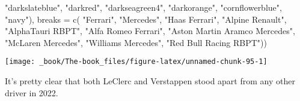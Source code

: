 \documentclass[
]{book}
\newenvironment{Shaded}{\begin{snugshade}}{\end{snugshade}}
\newcommand{\AttributeTok}[1]{\textcolor[rgb]{0.77,0.63,0.00}{#1}}
\newcommand{\FunctionTok}[1]{\textcolor[rgb]{0.00,0.00,0.00}{#1}}
\newcommand{\NormalTok}[1]{#1}
\newcommand{\StringTok}[1]{\textcolor[rgb]{0.31,0.60,0.02}{#1}}
\begin{document}
\begin{Shaded}
\begin{Highlighting}[]
                               \StringTok{"darkslateblue"}\NormalTok{, }
                                \StringTok{"darkred"}\NormalTok{,  }
                                \StringTok{"darkseagreen4"}\NormalTok{, }
                                \StringTok{"darkorange"}\NormalTok{, }
                                \StringTok{"cornflowerblue"}\NormalTok{,}
                               \StringTok{"navy"}\NormalTok{),}
                     \AttributeTok{breaks =} \FunctionTok{c}\NormalTok{( }\StringTok{"Ferrari"}\NormalTok{,}
                                 \StringTok{"Mercedes"}\NormalTok{,}
                                 \StringTok{"Haas Ferrari"}\NormalTok{,}
                                 \StringTok{"Alpine Renault"}\NormalTok{,}
                                 \StringTok{"AlphaTauri RBPT"}\NormalTok{,}
                                 \StringTok{"Alfa Romeo Ferrari"}\NormalTok{, }
                                 \StringTok{"Aston Martin Aramco Mercedes"}\NormalTok{,}
                                 \StringTok{"McLaren Mercedes"}\NormalTok{,}
                                 \StringTok{"Williams Mercedes"}\NormalTok{,}
                                 \StringTok{"Red Bull Racing RBPT"}\NormalTok{))}
\end{Highlighting}
\end{Shaded}

\begin{center}\texttt{[image: \_book/The-book\_files/figure-latex/unnamed-chunk-95-1]} \end{center}

It's pretty clear that both LeClerc and Verstappen stood apart from any other driver in 2022.
\end{document}
